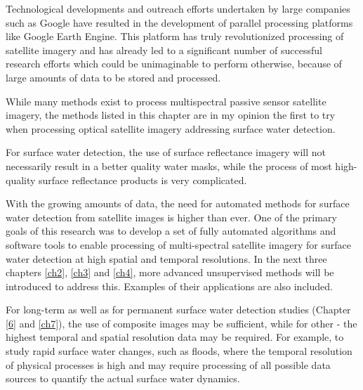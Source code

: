 Technological developments and outreach efforts undertaken by large companies such as Google have resulted in the development of parallel processing platforms like Google Earth Engine. This platform has truly revolutionized processing of satellite imagery and has already led to a significant number of successful research efforts which could be unimaginable to perform otherwise, because of large amounts of data to be stored and processed.

While many methods exist to process multispectral passive sensor satellite imagery, the methods listed in this chapter are in my opinion the first to try when processing optical satellite imagery addressing surface water detection. 

For surface water detection, the use of surface reflectance imagery will not necessarily result in a better quality water masks, while the process of most high-quality surface reflectance products is very complicated. 

With the growing amounts of data, the need for automated methods for surface water detection from satellite images is higher than ever. One of the primary goals of this research was to develop a set of fully automated algorithms and software tools to enable processing of multi-spectral satellite imagery for surface water detection at high spatial and temporal resolutions. In the next three chapters \ref{ch2}, \ref{ch3} and \ref{ch4}, more advanced unsupervised methods will be introduced to address this. Examples of their applications are also included. 

For long-term as well as for permanent surface water detection studies (Chapter \ref{6} and \ref{ch7}), the use of composite images may be sufficient, while for other - the highest temporal and spatial resolution data may be required. For example, to study rapid surface water changes, such as floods, where the temporal resolution of physical processes is high and may require processing of all possible data sources to quantify the actual surface water dynamics.

